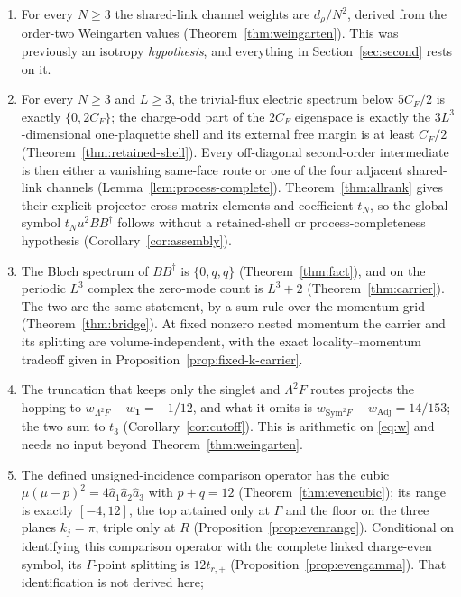 \documentclass[11pt]{article}
\theoremstyle{plain}
\theoremstyle{definition}
\theoremstyle{remark}
\newcommand{\dg}{^{\dagger}}
\begin{document}
\begin{enumerate}\itemsep2pt
\item For every $N\ge3$ the shared-link channel weights are $d_\rho/N^2$,
  derived from the order-two Weingarten values
  (Theorem~\ref{thm:weingarten}). This was previously an isotropy
  \emph{hypothesis}, and everything in Section~\ref{sec:second} rests on it.
\item For every $N\ge3$ and $L\ge3$, the trivial-flux electric spectrum below
  $5C_F/2$ is exactly $\{0,2C_F\}$; the charge-odd part of the $2C_F$
  eigenspace is exactly the $3L^3$-dimensional one-plaquette shell and its
  external free margin is at least $C_F/2$
  (Theorem~\ref{thm:retained-shell}). Every off-diagonal
  second-order intermediate is then either a vanishing same-face route or one
  of the four adjacent shared-link channels
  (Lemma~\ref{lem:process-complete}). Theorem~\ref{thm:allrank} gives their
  explicit projector cross matrix elements and coefficient $t_N$, so the
  global symbol $t_Nu^2BB\dg$ follows without a retained-shell or
  process-completeness hypothesis (Corollary~\ref{cor:assembly}).
\item The Bloch spectrum of $BB\dg$ is $\{0,q,q\}$ (Theorem~\ref{thm:fact}),
  and on the periodic $L^3$ complex the zero-mode count is $L^3+2$
  (Theorem~\ref{thm:carrier}). The two are the same statement, by a sum rule
  over the momentum grid (Theorem~\ref{thm:bridge}). At fixed nonzero nested
  momentum the carrier and its splitting are volume-independent, with the
  exact locality--momentum tradeoff given in
  Proposition~\ref{prop:fixed-k-carrier}.
\item\label{item:cutoff} The truncation that keeps only the singlet and $\Lambda^2F$ routes
  projects the hopping to $w_{\Lambda^2F}-w_{\mathbf 1}=-1/12$, and what it
  omits is $w_{\mathrm{Sym}^2F}-w_{\mathrm{Adj}}=14/153$; the two sum to
  $t_3$ (Corollary~\ref{cor:cutoff}). This is arithmetic on
  \eqref{eq:w} and needs no input beyond Theorem~\ref{thm:weingarten}.
\item The defined unsigned-incidence comparison operator has the cubic
  $\mu(\mu-p)^2=4\hat a_1\hat a_2\hat a_3$ with $p+q=12$
  (Theorem~\ref{thm:evencubic}); its range is exactly $[-4,12]$, the top
  attained only at $\Gamma$ and the floor on the three planes $k_j=\pi$, triple
  only at $R$ (Proposition~\ref{prop:evenrange}). Conditional on identifying
  this comparison operator with the complete linked charge-even symbol, its
  $\Gamma$-point splitting is $12t_{r,+}$
  (Proposition~\ref{prop:evengamma}). That identification is not derived here;

\end{enumerate}
\end{document}
